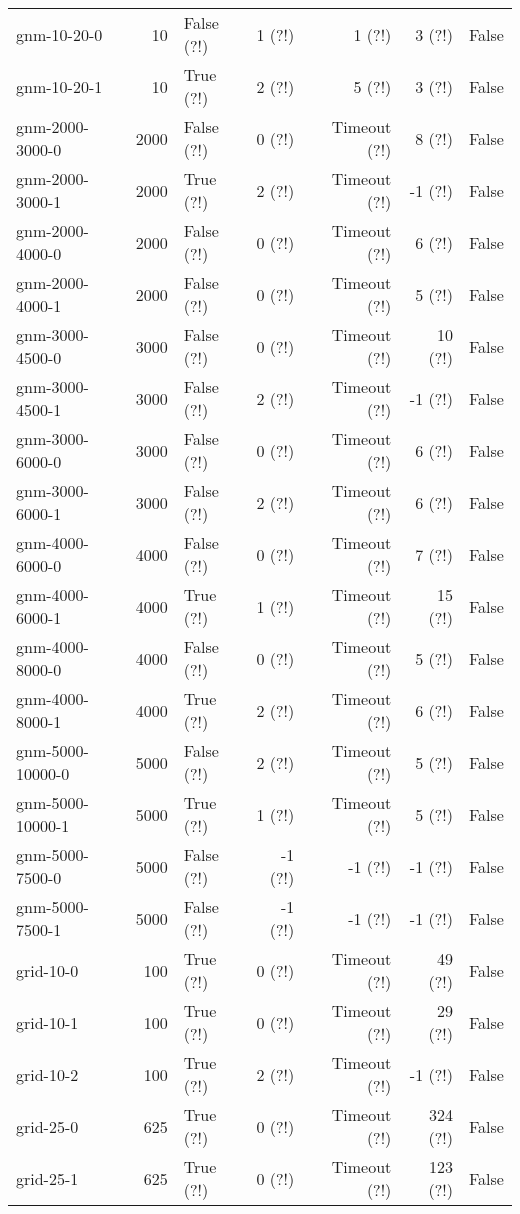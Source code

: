 \begin{longtable}{lrlrrrl}
gnm-10-20-0 & 10 & False (?!) & 1 (?!) & 1 (?!) & 3 (?!) & False \\
gnm-10-20-1 & 10 & True (?!) & 2 (?!) & 5 (?!) & 3 (?!) & False \\
gnm-2000-3000-0 & 2000 & False (?!) & 0 (?!) & Timeout (?!) & 8 (?!) & False \\
gnm-2000-3000-1 & 2000 & True (?!) & 2 (?!) & Timeout (?!) & -1 (?!) & False \\
gnm-2000-4000-0 & 2000 & False (?!) & 0 (?!) & Timeout (?!) & 6 (?!) & False \\
gnm-2000-4000-1 & 2000 & False (?!) & 0 (?!) & Timeout (?!) & 5 (?!) & False \\
gnm-3000-4500-0 & 3000 & False (?!) & 0 (?!) & Timeout (?!) & 10 (?!) & False \\
gnm-3000-4500-1 & 3000 & False (?!) & 2 (?!) & Timeout (?!) & -1 (?!) & False \\
gnm-3000-6000-0 & 3000 & False (?!) & 0 (?!) & Timeout (?!) & 6 (?!) & False \\
gnm-3000-6000-1 & 3000 & False (?!) & 2 (?!) & Timeout (?!) & 6 (?!) & False \\
gnm-4000-6000-0 & 4000 & False (?!) & 0 (?!) & Timeout (?!) & 7 (?!) & False \\
gnm-4000-6000-1 & 4000 & True (?!) & 1 (?!) & Timeout (?!) & 15 (?!) & False \\
gnm-4000-8000-0 & 4000 & False (?!) & 0 (?!) & Timeout (?!) & 5 (?!) & False \\
gnm-4000-8000-1 & 4000 & True (?!) & 2 (?!) & Timeout (?!) & 6 (?!) & False \\
gnm-5000-10000-0 & 5000 & False (?!) & 2 (?!) & Timeout (?!) & 5 (?!) & False \\
gnm-5000-10000-1 & 5000 & True (?!) & 1 (?!) & Timeout (?!) & 5 (?!) & False \\
gnm-5000-7500-0 & 5000 & False (?!) & -1 (?!) & -1 (?!) & -1 (?!) & False \\
gnm-5000-7500-1 & 5000 & False (?!) & -1 (?!) & -1 (?!) & -1 (?!) & False \\
grid-10-0 & 100 & True (?!) & 0 (?!) & Timeout (?!) & 49 (?!) & False \\
grid-10-1 & 100 & True (?!) & 0 (?!) & Timeout (?!) & 29 (?!) & False \\
grid-10-2 & 100 & True (?!) & 2 (?!) & Timeout (?!) & -1 (?!) & False \\
grid-25-0 & 625 & True (?!) & 0 (?!) & Timeout (?!) & 324 (?!) & False \\
grid-25-1 & 625 & True (?!) & 0 (?!) & Timeout (?!) & 123 (?!) & False \\

\end{longtable}

